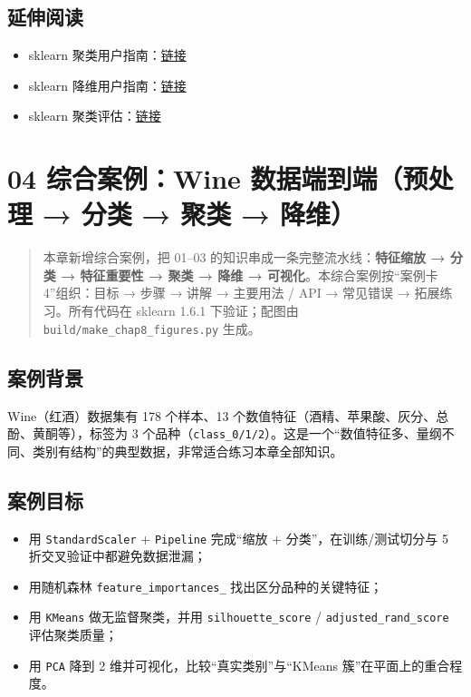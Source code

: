 \subsection{延伸阅读}\label{ux5ef6ux4f38ux9605ux8bfb-36}

\begin{itemize}
\tightlist
\item
  sklearn
  聚类用户指南：\href{https://scikit-learn.org/stable/modules/clustering.html}{链接}
\item
  sklearn
  降维用户指南：\href{https://scikit-learn.org/stable/modules/decomposition.html}{链接}
\item
  sklearn
  聚类评估：\href{https://scikit-learn.org/stable/modules/clustering.html\#clustering-performance-evaluation}{链接}
\end{itemize}

\section{04 综合案例：Wine 数据端到端（预处理 → 分类 → 聚类 →
降维）}\label{ux7efcux5408ux6848ux4f8bwine-ux6570ux636eux7aefux5230ux7aefux9884ux5904ux7406-ux5206ux7c7b-ux805aux7c7b-ux964dux7ef4}

\begin{quote}
本章新增综合案例，把 01--03 的知识串成一条完整流水线：\textbf{特征缩放 →
分类 → 特征重要性 → 聚类 → 降维 → 可视化}。本综合案例按``案例卡
4''组织：目标 → 步骤 → 讲解 → 主要用法 / API → 常见错误 →
拓展练习。所有代码在 sklearn 1.6.1 下验证；配图由
\texttt{build/make\_chap8\_figures.py} 生成。
\end{quote}

\subsection{案例背景}\label{ux6848ux4f8bux80ccux666f-3}

Wine（红酒）数据集有 178 个样本、13
个数值特征（酒精、苹果酸、灰分、总酚、黄酮等），标签为 3
个品种（\texttt{class\_0/1/2}）。这是一个``数值特征多、量纲不同、类别有结构''的典型数据，非常适合练习本章全部知识。

\subsection{案例目标}\label{ux6848ux4f8bux76eeux6807}

\begin{itemize}
\tightlist
\item
  用 \texttt{StandardScaler} + \texttt{Pipeline} 完成``缩放 +
  分类''，在训练/测试切分与 5 折交叉验证中都避免数据泄漏；
\item
  用随机森林 \texttt{feature\_importances\_} 找出区分品种的关键特征；
\item
  用 \texttt{KMeans} 做无监督聚类，并用 \texttt{silhouette\_score} /
  \texttt{adjusted\_rand\_score} 评估聚类质量；
\item
  用 \texttt{PCA} 降到 2 维并可视化，比较``真实类别''与``KMeans
  簇''在平面上的重合程度。
\end{itemize}

